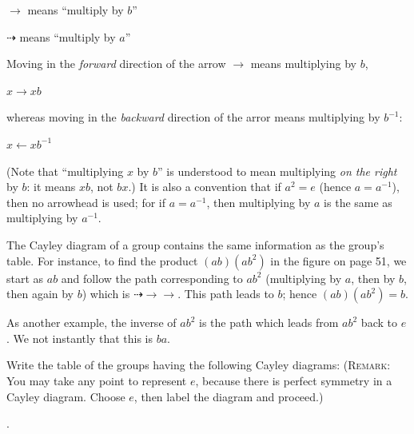 \documentclass[twoside]{amsart}
\begin{document}
\begin{enumerate}[A.]
\begin{center}
    $\to$ means ``multiply by $b$''

    $\dashrightarrow$ means ``multiply by $a$''
    \end{center}

    \noindent Moving in the \emph{forward} direction of the arrow $\to$
    means multiplying by $b$,

    \begin{center} $x \to xb$ \end{center}

    \noindent whereas moving in the \emph{backward} direction of the
    arror means multiplying by $b^{-1}$:

    \begin{center} $x \leftarrow xb^{-1}$ \end{center}

    \noindent (Note that ``multiplying $x$ by $b$'' is understood to
    mean multiplying \emph{on the right} by $b$: it means $xb$, not
    $bx$.) It is also a convention that if $a^2=e$ (hence $a=a^{-1}$), then
    no arrowhead is used; for if $a=a^{-1}$, then multiplying by $a$
    is the same as multiplying by $a^{-1}$.

    The Cayley diagram of a group contains the same information as the group's
    table. For instance, to find the product $(ab)(ab^2)$ in the figure on
    page 51, we start as $ab$ and follow the path corresponding to $ab^2$
    (multiplying by $a$, then by $b$, then again by $b$) which
    is $\dashrightarrow \to\to$. This path leads to $b$; hence 
    $(ab)(ab^2)=b$.

    As another example, the inverse of $ab^2$ is the path which leads from
    $ab^2$ back to $e$. We not instantly that this is $ba$.

    Write the table of the groups having the following Cayley diagrams:
    (\textsc{Remark}: You may take any point to represent $e$, because
    there is perfect symmetry in a Cayley diagram. Choose $e$, then
    label the diagram and proceed.)
    

    . 


\end{enumerate}
\end{document}
